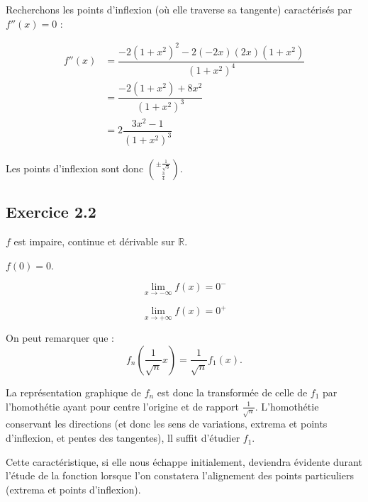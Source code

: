 \documentclass[a4paper,10pt]{report}
\begin{document}
Recherchons les points d'inflexion (où elle traverse sa tangente) caractérisés par $f''(x)=0$ :

\begin{equation*}
	\begin{split}
		f''(x) &= \dfrac{-2(1+x^2)^2-2(-2x)(2x)(1+x^2)}{(1+x^2)^4} \\
		       &= \dfrac{-2(1+x^2)+8x^2}{(1+x^2)^3} \\
		       &= 2\dfrac{3x^2-1}{(1+x^2)^3} 
	\end{split}
\end{equation*}

Les points d'inflexion sont donc $\binom{\pm\frac{1}{\sqrt{3}}}{\frac{3}{4}}$.



\subsection*{Exercice 2.2}

$f$ est impaire, continue et dérivable sur $\mathbb{R}$.

$f(0) = 0$.

\begin{displaymath}
\lim_{x \rightarrow -\infty} f(x) = 0^{-}
\end{displaymath}

\begin{displaymath}
	\lim_{x \rightarrow +\infty} f(x) = 0^{+}
\end{displaymath}

On peut remarquer que :
\begin{displaymath}
	f_n\left(\frac{1}{\sqrt{n}} x \right) = \frac{1}{\sqrt{n}} f_1(x).
\end{displaymath}

La représentation graphique de $f_n$ est donc la transformée de celle de $f_1$
par l'homothétie ayant pour centre l'origine et de rapport $\frac{1}{\sqrt{n}}$.
L'homothétie conservant les directions (et donc les sens de variations, extrema et
points d'inflexion, et pentes des tangentes), ll suffit d'étudier $f_1$.

Cette caractéristique, si elle nous échappe initialement, deviendra évidente durant
l'étude de la fonction lorsque l'on constatera l'alignement des points particuliers
(extrema et points d'inflexion).
\end{document}
